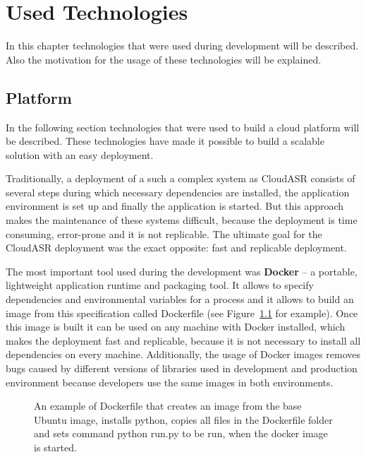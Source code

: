 \chapter{Used Technologies}\label{sec:technologies}
In this chapter technologies that were used during development will be described.
Also the motivation for the usage of these technologies will be explained.

\section{Platform}
In the following section technologies that were used to build a cloud platform will be described.
These technologies have made it possible to build a scalable solution with an easy deployment.

Traditionally, a deployment of a such a complex system as CloudASR consists of several steps
  during which necessary dependencies are installed,
  the application environment is set up
  and finally the application is started.
But this approach makes the maintenance of these systems difficult,
  because the deployment is time consuming, error-prone and it is not replicable.
The ultimate goal for the CloudASR deployment was the exact opposite: fast and replicable deployment.

The most important tool used during the development was \textbf{Docker} \cite{merkel2014docker}
  -- a portable, lightweight application runtime and packaging tool.
It allows to specify dependencies and environmental variables for a process
  and it allows to build an image from this specification called Dockerfile
  (see Figure~\ref{fig:dockerfile} for example).
Once this image is built it can be used on any machine with Docker installed,
  which makes the deployment fast and replicable,
  because it is not necessary to install all dependencies on every machine.
Additionally, the usage of Docker images removes bugs caused by different versions of libraries used in development and production environment
  because developers use the same images in both environments.

\begin{figure}[h]
  

  \caption{
    An example of Dockerfile that creates an image from the base Ubuntu image,
      installs python,
      copies all files in the Dockerfile folder
      and sets command python run.py to be run,
        when the docker image is started.
  }
  \label{fig:dockerfile}
\end{figure}


